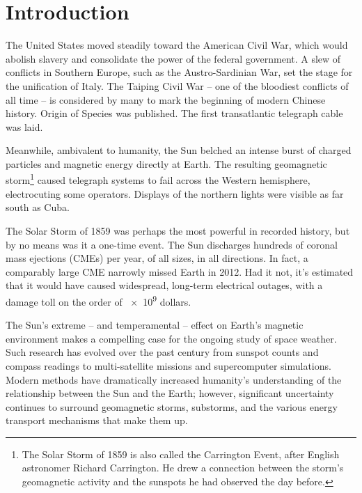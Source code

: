 
\chapter{Introduction}
  \label{ch_intro}

 The United States moved steadily toward the American Civil War, which would abolish slavery and consolidate the power of the federal government. A slew of conflicts in Southern Europe, such as the Austro-Sardinian War, set the stage for the unification of Italy. The Taiping Civil War -- one of the bloodiest conflicts of all time -- is considered by many to mark the beginning of modern Chinese history. Origin of Species was published. The first transatlantic telegraph cable was laid.

Meanwhile, ambivalent to humanity, the Sun belched an intense burst of charged particles and magnetic energy directly at Earth. The resulting geomagnetic storm\footnote{The Solar Storm of 1859 is also called the Carrington Event, after English astronomer Richard Carrington. He drew a connection between the storm's geomagnetic activity and the sunspots he had observed the day before.} caused telegraph systems to fail across the Western hemisphere\cite{green_2006}, electrocuting some operators. Displays of the northern lights were visible as far south as Cuba. 

The Solar Storm of 1859 was perhaps the most powerful in recorded history, but by no means was it a one-time event. The Sun discharges hundreds of coronal mass ejections (CMEs) per year, of all sizes, in all directions. In fact, a comparably large CME narrowly missed Earth in 2012\cite{nasa_2012}. Had it not, it's estimated\cite{lloyds_2013} that it would have caused widespread, long-term electrical outages, with a damage toll on the order of \num{e9} dollars. 

The Sun's extreme -- and temperamental -- effect on Earth's magnetic environment makes a compelling case for the ongoing study of space weather. Such research has evolved over the past century from sunspot counts and compass readings to multi-satellite missions and supercomputer simulations. Modern methods have dramatically increased humanity's understanding of the relationship between the Sun and the Earth; however, significant uncertainty continues to surround geomagnetic storms, substorms, and the various energy transport mechanisms that make them up. 

